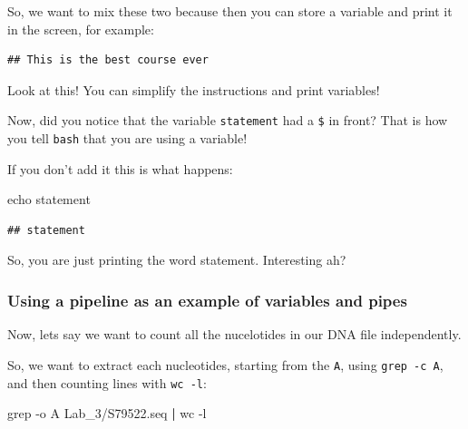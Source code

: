 \documentclass[
]{book}
\newenvironment{Shaded}{\begin{snugshade}}{\end{snugshade}}
\newcommand{\AttributeTok}[1]{\textcolor[rgb]{0.77,0.63,0.00}{#1}}
\newcommand{\BuiltInTok}[1]{#1}
\newcommand{\FunctionTok}[1]{\textcolor[rgb]{0.00,0.00,0.00}{#1}}
\newcommand{\KeywordTok}[1]{\textcolor[rgb]{0.13,0.29,0.53}{\textbf{#1}}}
\newcommand{\NormalTok}[1]{#1}
\newcommand{\OperatorTok}[1]{\textcolor[rgb]{0.81,0.36,0.00}{\textbf{#1}}}
\newcommand{\StringTok}[1]{\textcolor[rgb]{0.31,0.60,0.02}{#1}}
\newcommand{\VariableTok}[1]{\textcolor[rgb]{0.00,0.00,0.00}{#1}}
\begin{document}
So, we want to mix these two because then you can store a variable and print it in the screen, for example:

\begin{Shaded}
\end{Shaded}

\begin{verbatim}
## This is the best course ever
\end{verbatim}

Look at this! You can simplify the instructions and print variables!

Now, did you notice that the variable \texttt{statement} had a \texttt{\$} in front? That is how you tell \texttt{bash} that you are using a variable!

If you don't add it this is what happens:

\begin{Shaded}
\begin{Highlighting}[]
\BuiltInTok{echo}\NormalTok{ statement}
\end{Highlighting}
\end{Shaded}

\begin{verbatim}
## statement
\end{verbatim}

So, you are just printing the word statement. Interesting ah?

\hypertarget{using-a-pipeline-as-an-example-of-variables-and-pipes}{%
\subsubsection{Using a pipeline as an example of variables and pipes}\label{using-a-pipeline-as-an-example-of-variables-and-pipes}}

Now, lets say we want to count all the nucelotides in our DNA file independently.

So, we want to extract each nucleotides, starting from the \texttt{A}, using \texttt{grep\ -c\ A}, and then counting lines with \texttt{wc\ -l}:

\begin{Shaded}
\begin{Highlighting}[]
\FunctionTok{grep} \AttributeTok{{-}o}\NormalTok{ A Lab\_3/S79522.seq }\KeywordTok{|} \FunctionTok{wc} \AttributeTok{{-}l}
\end{Highlighting}
\end{Shaded}
\end{document}
